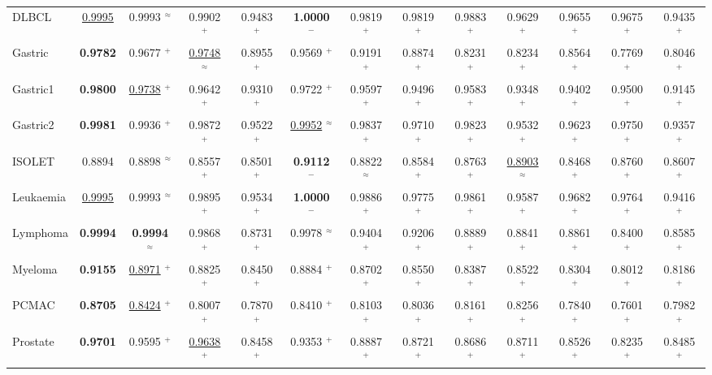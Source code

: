 \begin{table}[t]
{\begin{tabular}{lcccccccccccc}
DLBCL            & \underline{0.9995} & 0.9993 $^{\approx}$ & 0.9902 $^{+}$ & 0.9483 $^{+}$ & \textbf{1.0000} $^{-}$ & 0.9819 $^{+}$ & 0.9819 $^{+}$ & 0.9883 $^{+}$ & 0.9629 $^{+}$ & 0.9655 $^{+}$ & 0.9675 $^{+}$ & 0.9435 $^{+}$ \\
Gastric          & \textbf{0.9782} & 0.9677 $^{+}$ & \underline{0.9748} $^{\approx}$ & 0.8955 $^{+}$ & 0.9569 $^{+}$ & 0.9191 $^{+}$ & 0.8874 $^{+}$ & 0.8231 $^{+}$ & 0.8234 $^{+}$ & 0.8564 $^{+}$ & 0.7769 $^{+}$ & 0.8046 $^{+}$ \\
Gastric1         & \textbf{0.9800} & \underline{0.9738} $^{+}$ & 0.9642 $^{+}$ & 0.9310 $^{+}$ & 0.9722 $^{+}$ & 0.9597 $^{+}$ & 0.9496 $^{+}$ & 0.9583 $^{+}$ & 0.9348 $^{+}$ & 0.9402 $^{+}$ & 0.9500 $^{+}$ & 0.9145 $^{+}$ \\
Gastric2         & \textbf{0.9981} & 0.9936 $^{+}$ & 0.9872 $^{+}$ & 0.9522 $^{+}$ & \underline{0.9952} $^{\approx}$ & 0.9837 $^{+}$ & 0.9710 $^{+}$ & 0.9823 $^{+}$ & 0.9532 $^{+}$ & 0.9623 $^{+}$ & 0.9750 $^{+}$ & 0.9357 $^{+}$ \\
ISOLET           & 0.8894 & 0.8898 $^{\approx}$ & 0.8557 $^{+}$ & 0.8501 $^{+}$ & \textbf{0.9112} $^{-}$ & 0.8822 $^{\approx}$ & 0.8584 $^{+}$ & 0.8763 $^{+}$ & \underline{0.8903} $^{\approx}$ & 0.8468 $^{+}$ & 0.8760 $^{+}$ & 0.8607 $^{+}$ \\
Leukaemia        & \underline{0.9995} & 0.9993 $^{\approx}$ & 0.9895 $^{+}$ & 0.9534 $^{+}$ & \textbf{1.0000} $^{-}$ & 0.9886 $^{+}$ & 0.9775 $^{+}$ & 0.9861 $^{+}$ & 0.9587 $^{+}$ & 0.9682 $^{+}$ & 0.9764 $^{+}$ & 0.9416 $^{+}$ \\
Lymphoma         & \textbf{0.9994} & \textbf{0.9994} $^{\approx}$ & 0.9868 $^{+}$ & 0.8731 $^{+}$ & 0.9978 $^{\approx}$ & 0.9404 $^{+}$ & 0.9206 $^{+}$ & 0.8889 $^{+}$ & 0.8841 $^{+}$ & 0.8861 $^{+}$ & 0.8400 $^{+}$ & 0.8585 $^{+}$ \\
Myeloma          & \textbf{0.9155} & \underline{0.8971} $^{+}$ & 0.8825 $^{+}$ & 0.8450 $^{+}$ & 0.8884 $^{+}$ & 0.8702 $^{+}$ & 0.8550 $^{+}$ & 0.8387 $^{+}$ & 0.8522 $^{+}$ & 0.8304 $^{+}$ & 0.8012 $^{+}$ & 0.8186 $^{+}$ \\
PCMAC            & \textbf{0.8705} & \underline{0.8424} $^{+}$ & 0.8007 $^{+}$ & 0.7870 $^{+}$ & 0.8410 $^{+}$ & 0.8103 $^{+}$ & 0.8036 $^{+}$ & 0.8161 $^{+}$ & 0.8256 $^{+}$ & 0.7840 $^{+}$ & 0.7601 $^{+}$ & 0.7982 $^{+}$ \\
Prostate         & \textbf{0.9701} & 0.9595 $^{+}$ & \underline{0.9638} $^{+}$ & 0.8458 $^{+}$ & 0.9353 $^{+}$ & 0.8887 $^{+}$ & 0.8721 $^{+}$ & 0.8686 $^{+}$ & 0.8711 $^{+}$ & 0.8526 $^{+}$ & 0.8235 $^{+}$ & 0.8485 $^{+}$ \\

\end{tabular}}
\end{table}
